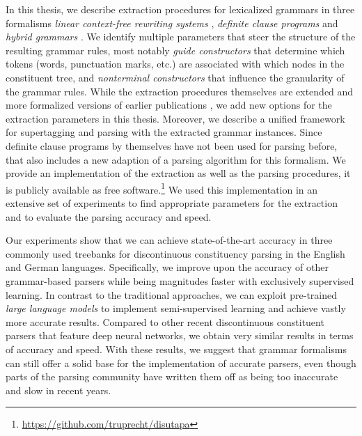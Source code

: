 \documentclass{scrartcl}
\begin{document}
    In this thesis, we describe extraction procedures for lexicalized grammars in three formalisms \emph{linear context-free rewriting systems} \citep{VijWeiJos87}, \emph{definite clause programs} \citep{Der85} and \emph{hybrid grammars} \citep{Ned14}.
    We identify multiple parameters that steer the structure of the resulting grammar rules, most notably \emph{guide constructors} that determine which tokens (words, punctuation marks, etc.) are associated with which nodes in the constituent tree, and \emph{nonterminal constructors} that influence the granularity of the grammar rules.
    While the extraction procedures themselves are extended and more formalized versions of earlier publications \citep{RupMoe21,Rup22}, we add new options for the extraction parameters in this thesis.
    Moreover, we describe a unified framework for supertagging and parsing with the extracted grammar instances.
    Since definite clause programs by themselves have not been used for parsing before, that also includes a new adaption of a parsing algorithm for this formalism.
    We provide an implementation of the extraction as well as the parsing procedures, it is publicly available as free software.\footnote{\url{https://github.com/truprecht/disutapa}}
    We used this implementation in an extensive set of experiments to find appropriate parameters for the extraction and to evaluate the parsing accuracy and speed.

    Our experiments show that we can achieve state-of-the-art accuracy in three commonly used treebanks for discontinuous constituency parsing in the English and German languages.
    Specifically, we improve upon the accuracy of other grammar-based parsers while being magnitudes faster with exclusively supervised learning.
    In contrast to the traditional approaches, we can exploit pre-trained \emph{large language models} to implement semi-supervised learning and achieve vastly more accurate results.
    Compared to other recent discontinuous constituent parsers that feature deep neural networks, we obtain very similar results in terms of accuracy and speed.
    With these results, we suggest that grammar formalisms can still offer a solid base for the implementation of accurate parsers, even though parts of the parsing community have written them off as being too inaccurate and slow in recent years.
    
    
\end{document}
